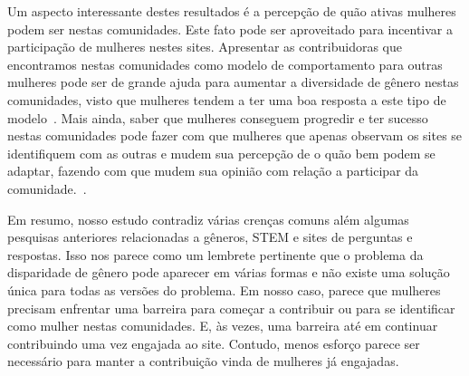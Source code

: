 
Um aspecto interessante destes resultados é a percepção de quão ativas mulheres podem ser nestas comunidades. Este fato pode ser aproveitado para incentivar a participação de mulheres nestes sites. Apresentar as contribuidoras que encontramos nestas comunidades como modelo de comportamento para outras mulheres pode ser de grande ajuda para aumentar a diversidade de gênero nestas comunidades, visto que mulheres tendem a ter uma boa resposta a este tipo de modelo~\cite{smith1986effect,nixon1999educational}. Mais ainda, saber que mulheres conseguem progredir e ter sucesso nestas comunidades pode fazer com que mulheres que apenas observam os sites se identifiquem com as outras e mudem sua percepção de o quão bem podem se adaptar, fazendo com que mudem sua opinião com relação a participar da comunidade.~\cite{ehrlinger2003chronic}.


Em resumo, nosso estudo contradiz várias crenças comuns além algumas pesquisas anteriores relacionadas a gêneros, STEM e sites de perguntas e respostas. Isso nos parece como um lembrete pertinente que o problema da disparidade de gênero pode aparecer em várias formas e não existe uma solução única para todas as versões do problema. Em nosso caso, parece que mulheres precisam enfrentar uma barreira para começar a contribuir ou para se identificar como mulher nestas comunidades. E, às vezes, uma barreira até em continuar contribuindo uma vez engajada ao site. Contudo, menos esforço parece ser necessário para manter a contribuição vinda de mulheres já engajadas.

